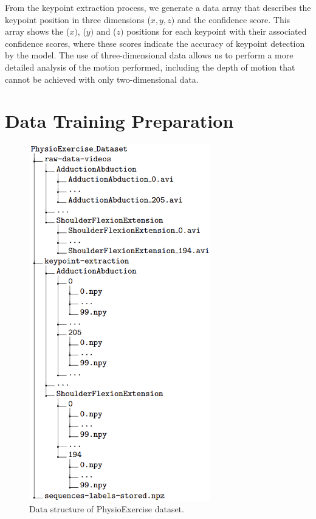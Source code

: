 From the keypoint extraction process, we generate a data array that describes the keypoint position in three dimensions (\(x,y,z)\) and the confidence score. This array shows the (\(x)\), (\(y)\) and (\(z)\) positions for each keypoint with their associated confidence scores, where these scores indicate the accuracy of keypoint detection by the model. The use of three-dimensional data allows us to perform a more detailed analysis of the motion performed, including the depth of motion that cannot be achieved with only two-dimensional data.

\section{Data Training Preparation}
\label{sec:DataTrainingPreparation}
\begin{figure}[]
	\centering
	\includegraphics[width=0.7\textwidth]{bab4/ar_DataStructure.png}
	\caption{Data structure of PhysioExercise dataset.}
	\label{fig:DataStructure}
\end{figure}

